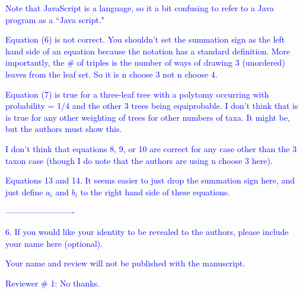 \documentclass[11pt]{letter}
\begin{document}
\begin{letter}{}
\textcolor{blue}{Note that JavaScript is a language, so it a bit confusing to refer to a Java program as a ``Java script."}



\textcolor{blue}{Equation (6) is not correct. You shouldn't set the summation sign as the left hand side of an equation because the notation has a standard definition. More importantly, the $\#$ of triples is the number of ways of drawing 3 (unordered) leaves from the leaf set. So it is n choose 3 not n choose 4.}



\textcolor{blue}{Equation (7) is true for a three-leaf tree with a polytomy occurring with probability = 1/4 and the other 3 trees being equiprobable. I don't think that is is true for any other weighting of trees for other numbers of taxa. It might be, but the authors must show this.}



\textcolor{blue}{I don't think that equations 8, 9, or 10 are correct for any case other than the 3 taxon case (though I do note that the authors are using n choose 3 here).}



\textcolor{blue}{Equations 13 and 14. It seems easier to just drop the summation sign here, and just define $a_i$ and $b_i$ to the right hand side of these equations.}



\textcolor{blue}{-------------------------}

\textcolor{blue}{6. If you would like your identity to be revealed to the authors, please include your name here (optional).}


\textcolor{blue}{Your name and review will not be published with the manuscript.}


\textcolor{blue}{Reviewer $\#$ 1: No thanks.}



\end{letter}
\end{document}
